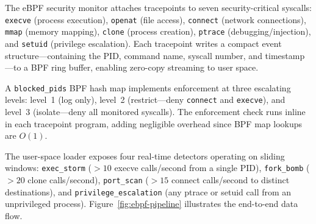 \documentclass[11pt,letterpaper]{article}
\begin{document}
The eBPF security monitor attaches tracepoints to seven
security-critical syscalls: \texttt{execve} (process execution),
\texttt{openat} (file access), \texttt{connect} (network connections),
\texttt{mmap} (memory mapping), \texttt{clone} (process creation),
\texttt{ptrace} (debugging/injection), and \texttt{setuid} (privilege
escalation).  Each tracepoint writes a compact event
structure---containing the PID, command name, syscall number, and
timestamp---to a BPF ring buffer, enabling zero-copy streaming to user
space.

A \texttt{blocked\_pids} BPF hash map implements enforcement at three
escalating levels: level~1 (log only), level~2 (restrict---deny
\texttt{connect} and \texttt{execve}), and level~3 (isolate---deny all
monitored syscalls).  The enforcement check runs inline in each
tracepoint program, adding negligible overhead since BPF map lookups
are $O(1)$.

The user-space loader exposes four real-time detectors operating on
sliding windows: \texttt{exec\_storm} ($> 10$ execve calls/second from
a single PID), \texttt{fork\_bomb} ($> 20$ clone calls/second),
\texttt{port\_scan} ($> 15$ connect calls/second to distinct
destinations), and \texttt{privilege\_escalation} (any ptrace or setuid
call from an unprivileged process).
Figure~\ref{fig:ebpf-pipeline} illustrates the end-to-end data flow.
\end{document}
